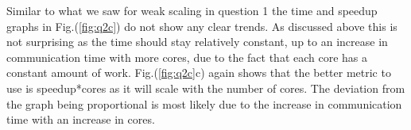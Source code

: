 \documentclass[12pt]{article}
\theoremstyle{plain}
\theoremstyle{definition}
\begin{document}
Similar to what we saw for weak scaling in question 1 the time and speedup graphs in Fig.(\ref{fig:q2c}) do not show any clear trends. As discussed above this is not surprising as the time should stay relatively constant, up to an increase in communication time with more cores, due to the fact that each core has a constant amount of work. Fig.(\ref{fig:q2c}c) again shows that the better metric to use is speedup*cores as it will scale with the number of cores. The deviation from the graph being proportional is most likely due to the increase in communication time with an increase in cores.  

\end{document}
